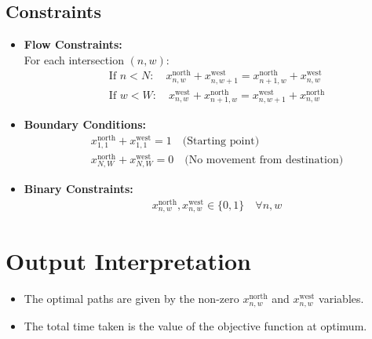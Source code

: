 \documentclass{article}
\begin{document}
\subsection*{Constraints}
\begin{itemize}
    \item \textbf{Flow Constraints:}\\
    For each intersection $(n, w)$:
    \begin{align*}
    & \text{If } n < N: \quad x_{n,w}^{\text{north}} + x_{n,w+1}^{\text{west}} = x_{n+1,w}^{\text{north}} + x_{n,w}^{\text{west}} \\
    & \text{If } w < W: \quad x_{n,w}^{\text{west}} + x_{n+1,w}^{\text{north}} = x_{n,w+1}^{\text{west}} + x_{n,w}^{\text{north}}
    \end{align*}

    \item \textbf{Boundary Conditions:}
    \begin{align*}
    & x_{1,1}^{\text{north}} + x_{1,1}^{\text{west}} = 1 \quad \text{(Starting point)} \\
    & x_{N,W}^{\text{north}} + x_{N,W}^{\text{west}} = 0 \quad \text{(No movement from destination)}
    \end{align*}
    
    \item \textbf{Binary Constraints:}
    \begin{align*}
    & x_{n,w}^{\text{north}}, x_{n,w}^{\text{west}} \in \{0, 1\} \quad \forall n, w
    \end{align*}
\end{itemize}

\section*{Output Interpretation}
\begin{itemize}
    \item The optimal paths are given by the non-zero $x_{n,w}^{\text{north}}$ and $x_{n,w}^{\text{west}}$ variables.
    \item The total time taken is the value of the objective function at optimum.
\end{itemize}
\end{document}
